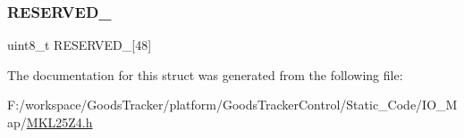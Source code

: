 \mbox{\label{struct_m_c_m___mem_map_ad8a834e9c0be4b8a1f57679868c10f2d}} 
\subsubsection{\texorpdfstring{R\+E\+S\+E\+R\+V\+E\+D\+\_}{RESERVED\_1}}
{\footnotesize\ttfamily uint8\+\_\+t R\+E\+S\+E\+R\+V\+E\+D\+\_\mbox{[}48\mbox{]}}



The documentation for this struct was generated from the following file\+:\begin{DoxyCompactItemize}
\item 
F\+:/workspace/\+Goods\+Tracker/platform/\+Goods\+Tracker\+Control/\+Static\+\_\+\+Code/\+I\+O\+\_\+\+Map/\hyperlink{_m_k_l25_z4_8h}{M\+K\+L25\+Z4.\+h}\end{DoxyCompactItemize}

